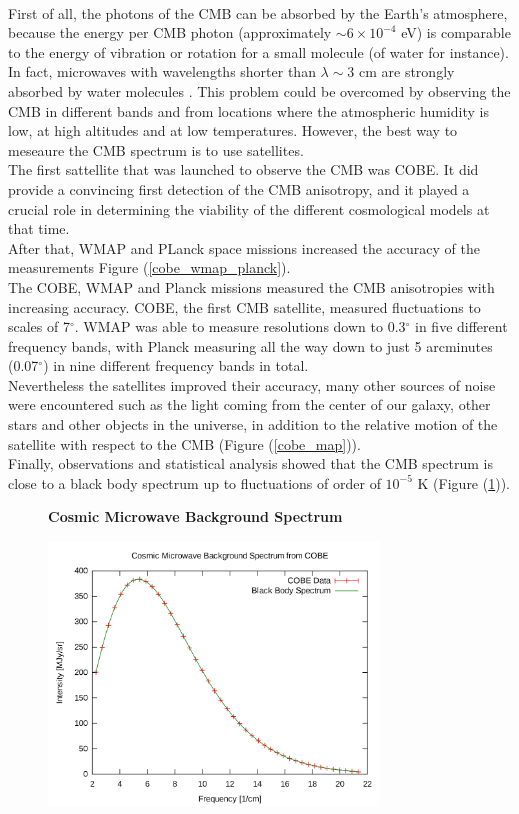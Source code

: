 \documentclass{article}
\begin{document}
\\
First of all, the photons of the CMB can be absorbed by the Earth's atmosphere, because the energy per CMB photon (approximately $\sim 6 \times 10 ^{-4}$ eV) is comparable to the energy of vibration or rotation for a small molecule (of water for instance). 
In fact, microwaves with wavelengths shorter than $\lambda \sim 3$ cm are strongly absorbed by water molecules \citep{RydenIntroCosmoPdf}.
This problem could be overcomed by observing the CMB in different bands and from locations where the atmospheric humidity is low, at high altitudes and at low temperatures.
However, the best way to meseaure the CMB spectrum is to use satellites.\\
The first sattellite that was launched to observe the CMB was COBE. 
It did provide a convincing first detection of the CMB anisotropy, and it played a crucial role in determining the viability of the different cosmological models at that time.
\\
After that, WMAP and PLanck space missions  increased the accuracy of the measurements Figure (\ref{cobe_wmap_planck}).\\
The COBE, WMAP and Planck missions measured the CMB anisotropies with increasing accuracy. COBE, the first CMB satellite, measured fluctuations to scales of 7$^\circ$. WMAP was able to measure resolutions down to 0.3$^\circ$ in five different frequency bands, with Planck measuring all the way down to just 5 arcminutes (0.07$^\circ$) in nine different frequency bands in total.\\
Nevertheless the satellites improved their accuracy, many other sources of noise were encountered such as the light coming from the center of our galaxy, other stars and other objects in the universe, in addition to the relative motion of the satellite with respect to the CMB (Figure (\ref{cobe_map})).\\ 
Finally, observations and statistical analysis showed that the CMB spectrum is close to a black body spectrum up to fluctuations of order of $10^{-5}$ K (Figure (\ref{cobe_blackbody})).\\

\begin{figure}[h]
\centering
    \textbf{Cosmic Microwave Background  Spectrum}\par\medskip
\centering
   {\includegraphics[height=7cm]{blackbody}}
\caption{}
\label{cobe_blackbody}
\end{figure}
\end{document}
